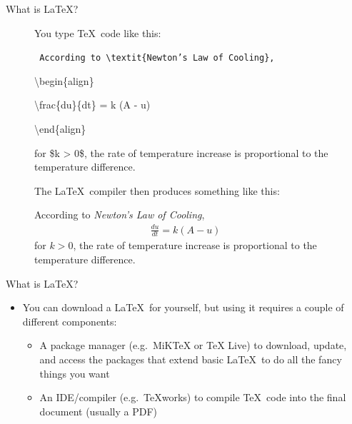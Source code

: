 \documentclass{beamer} %
\begin{document}
\begin{frame}{What is \LaTeX?}

\begin{figure}
	\begin{minipage}{0.45\textwidth}
		You type \TeX\ code like this:
		
		\quad
		
		{\tt \tiny
		According to \textbackslash textit\{Newton's Law of Cooling\},
		
		\quad
		
		\textbackslash begin\{align\}
		
		\qquad \textbackslash frac\{du\}\{dt\} = k (A - u)
		
		\textbackslash end\{align\}
		
		for \$k > 0\$, the rate of temperature increase is proportional to the temperature difference.
		}
	\end{minipage}
	\qquad
	\begin{minipage}{0.45\textwidth}
		The \LaTeX\ compiler then produces something like this:
		
		\quad
		
		{\tiny
		According to \textit{Newton's Law of Cooling},
		\begin{align}
			\frac{du}{dt} = k (A - u)
		\end{align}
		for $k > 0$, the rate of temperature increase is proportional to the temperature difference.
		}
	\end{minipage}
\end{figure}

\end{frame}

\begin{frame}{What is \LaTeX?}

\begin{itemize}
	\item You can download a \LaTeX\ for yourself, but using it requires a couple of different components:
	\begin{itemize}
		\item A package manager (e.g.~MiKTeX or TeX Live) to download, update, and access the packages that extend basic \LaTeX\ to do all the fancy things you want
		\item An IDE/compiler (e.g.~TeXworks) to compile \TeX\ code into the final document (usually a PDF)
	\end{itemize}
\end{itemize}

\end{frame}
\end{document}
